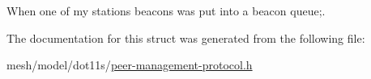When one of my station\textquotesingle{}s beacons was put into a beacon queue;. 



The documentation for this struct was generated from the following file\+:\begin{DoxyCompactItemize}
\item 
mesh/model/dot11s/\hyperlink{peer-management-protocol_8h}{peer-\/management-\/protocol.\+h}\end{DoxyCompactItemize}
